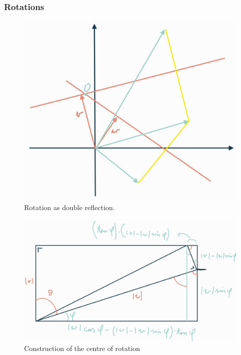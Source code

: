 \subsubsection{Rotations}
\begin{figure}[h!]
\centering
\includegraphics[width=.8\textwidth]{doubleReflection}
\caption{Rotation as double reflection.}
\end{figure}

\begin{figure}[h!]
\centering
\includegraphics[width=.8\textwidth]{centreOfRotationConstruction}
\caption{Construction of the centre of rotation} 
\end{figure}

